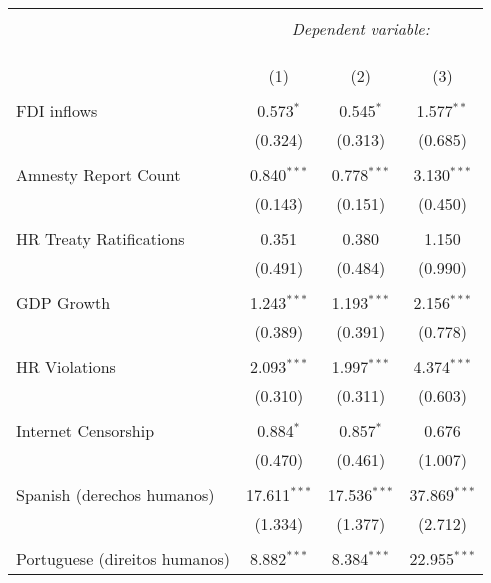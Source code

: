 
\begin{table}[!htbp] \centering 
  \caption{} 
  \label{} 
\begin{tabular}{@{\extracolsep{5pt}}lccc} 
\\[-1.8ex]\hline 
\hline \\[-1.8ex] 
 & \multicolumn{3}{c}{\textit{Dependent variable:}} \\ 
\cline{2-4} 
\\[-1.8ex] & \multicolumn{3}{c}{ } \\ 
\\[-1.8ex] & (1) & (2) & (3)\\ 
\hline \\[-1.8ex] 
 FDI inflows & 0.573$^{*}$ & 0.545$^{*}$ & 1.577$^{**}$ \\ 
  & (0.324) & (0.313) & (0.685) \\ 
  & & & \\ 
 Amnesty Report Count & 0.840$^{***}$ & 0.778$^{***}$ & 3.130$^{***}$ \\ 
  & (0.143) & (0.151) & (0.450) \\ 
  & & & \\ 
 HR Treaty Ratifications & 0.351 & 0.380 & 1.150 \\ 
  & (0.491) & (0.484) & (0.990) \\ 
  & & & \\ 
 GDP Growth & 1.243$^{***}$ & 1.193$^{***}$ & 2.156$^{***}$ \\ 
  & (0.389) & (0.391) & (0.778) \\ 
  & & & \\ 
 HR Violations & 2.093$^{***}$ & 1.997$^{***}$ & 4.374$^{***}$ \\ 
  & (0.310) & (0.311) & (0.603) \\ 
  & & & \\ 
 Internet Censorship & 0.884$^{*}$ & 0.857$^{*}$ & 0.676 \\ 
  & (0.470) & (0.461) & (1.007) \\ 
  & & & \\ 
 Spanish (derechos humanos) & 17.611$^{***}$ & 17.536$^{***}$ & 37.869$^{***}$ \\ 
  & (1.334) & (1.377) & (2.712) \\ 
  & & & \\ 
 Portuguese (direitos humanos) & 8.882$^{***}$ & 8.384$^{***}$ & 22.955$^{***}$ \\ 

\end{tabular}
\end{table}
